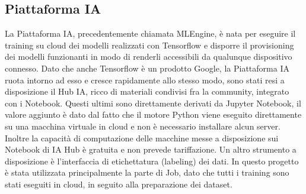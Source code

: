 \subsection{Piattaforma IA}\label{mlengine}
La Piattaforma IA, precedentemente chiamata MLEngine, è nata per eseguire il training su cloud dei modelli realizzati con Tensorflow e disporre il provisioning dei modelli funzionanti in modo di renderli accessibili da qualunque dispositivo connesso. Dato che anche Tensorflow è un prodotto Google, la Piattaforma IA ruota intorno ad esso e cresce rapidamente allo stesso modo, sono stati resi a disposizione il Hub IA, ricco di materiali condivisi fra la community, integrato con i Notebook. Questi ultimi sono direttamente derivati da Jupyter Notebook, il valore aggiunto è dato dal fatto che il motore Python viene eseguito direttamente su una macchina virtuale in cloud e non è necessario installare alcun server. Inoltre la capacità di computazione delle macchine messe a disposizione sui Notebook di IA Hub è gratuita e non prevede tariffazione. Un altro strumento a disposizione è l'interfaccia di etichettatura (labeling) dei dati.
In questo progetto è stata utilizzata principalmente la parte di Job, dato che tutti i training sono stati eseguiti in cloud, in seguito alla preparazione dei dataset.
